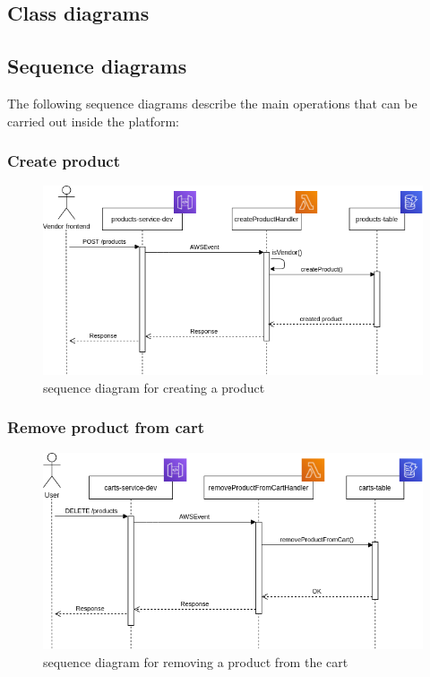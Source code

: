 \subsection{Class diagrams}
\subsection{Sequence diagrams}
The following sequence diagrams describe the main operations that can be carried out inside the platform:
\subsubsection{Create product}
\begin{figure}[!h]
    \vspace{5px}
    \includegraphics[scale=0.5]{../../../../Images/Diagrammi/maintainerManual/createProductSequence.png}
    \centering
    \caption{sequence diagram for creating a product} 
\end{figure}
\pagebreak
\subsubsection{Remove product from cart}
\begin{figure}[!h]
    \vspace{5px}
    \includegraphics[scale=0.5]{../../../../Images/Diagrammi/maintainerManual/removeProductFromCart.png}
    \centering
    \caption{sequence diagram for removing a product from the cart} 
\end{figure}
\pagebreak
